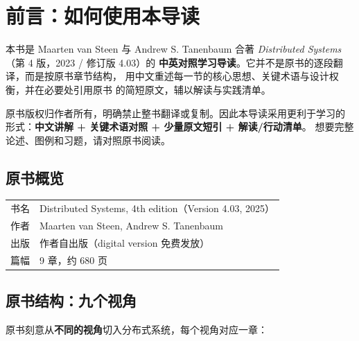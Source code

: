 \chapter*{前言：如何使用本导读}

本书是 Maarten van Steen 与 Andrew S. Tanenbaum 合著
\textit{Distributed Systems}（第 4 版，2023 / 修订版 4.03）的
\textbf{中英对照学习导读}。它并不是原书的逐段翻译，而是按原书章节结构，
用中文重述每一节的核心思想、关键术语与设计权衡，并在必要处引用原书
的简短原文，辅以解读与实践清单。

\begin{ideabox}
原书版权归作者所有，明确禁止整书翻译或复制。因此本导读采用更利于学习的
形式：\textbf{中文讲解 + 关键术语对照 + 少量原文短引 + 解读/行动清单}。
想要完整论述、图例和习题，请对照原书阅读。
\end{ideabox}

\section*{原书概览}

\begin{center}
\begin{tabular}{@{}ll@{}}
\toprule
书名 & Distributed Systems, 4th edition（Version 4.03, 2025）\\
作者 & Maarten van Steen, Andrew S. Tanenbaum\\
出版 & 作者自出版（digital version 免费发放）\\
篇幅 & 9 章，约 680 页\\
\bottomrule
\end{tabular}
\end{center}

\section*{原书结构：九个视角}

原书刻意从\textbf{不同的视角}切入分布式系统，每个视角对应一章：

